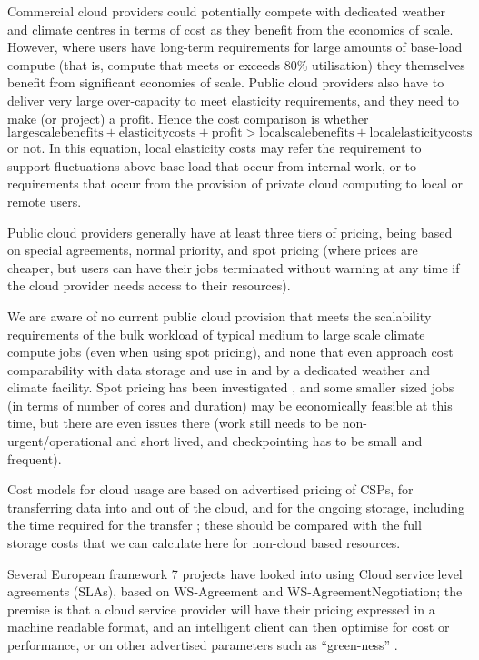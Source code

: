 \documentclass{../../template/esiwace-report}
\begin{document}
Commercial cloud providers could potentially compete with dedicated weather and climate centres in terms of cost as they benefit from the economics of scale. However, where users have long-term requirements for large amounts of base-load compute (that is, compute that meets or exceeds 80\% utilisation) they themselves benefit from significant economies of scale. Public cloud providers also have to deliver very large over-capacity to meet elasticity requirements, and they need to make (or project) a profit. Hence the cost comparison is whether
\begin{equation}
  \mathrm{large scale benefits} + \mathrm{elasticity costs} + \mathrm{ profit} > \mathrm {local scale benefits} + \mathrm{local elasticity costs}
\end{equation}
or not.  In this equation, local elasticity costs may refer the requirement to support fluctuations above base load that occur from internal work, or to requirements that occur from the provision of private cloud computing to local or remote users.

Public cloud providers generally have at least three tiers of pricing, being based on special agreements, normal priority, and spot pricing (where prices are cheaper, but users can have their jobs terminated without warning at any time if the cloud provider needs access to their resources).

We are aware of no current public cloud provision that meets the scalability requirements of the bulk workload of typical medium to large scale climate compute jobs (even when using spot pricing), and none that even approach cost comparability with data storage and use in and by a dedicated weather and climate facility. Spot pricing has been investigated \cite{girone}, and some smaller sized jobs (in terms of number of cores and duration) may be economically feasible at this time, but there are even issues there (work still needs to be non-urgent/operational and short lived, and checkpointing has to be small and frequent).

Cost models for cloud usage are based on advertised pricing of CSPs, for transferring data into and out of the cloud, and for the ongoing storage, including the time required for the transfer \cite{kindura}; these should be compared with the full storage costs
that we can calculate here for non-cloud based resources.

Several European framework 7 projects have looked into using Cloud service level agreements (SLAs), based on WS-Agreement and WS-AgreementNegotiation; the premise is that a cloud service provider will have their pricing expressed in a machine readable format, and an intelligent client can then optimise for cost or performance, or on other advertised parameters such as ``green-ness'' \cite{blasi}.
\end{document}
